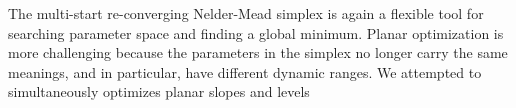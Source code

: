 \documentclass[iop]{emulateapj}
\begin{document}
The multi-start re-converging Nelder-Mead simplex is again a flexible tool for searching parameter space and finding a global minimum. Planar optimization is more challenging because the parameters in the simplex no longer carry the same meanings, and in particular, have different dynamic ranges. We attempted to simultaneously optimizes planar slopes and levels


\end{document}
